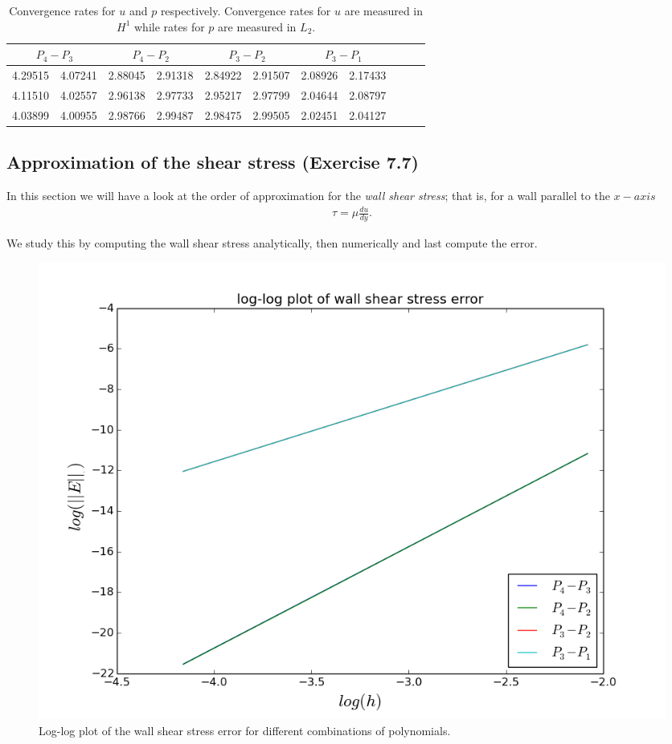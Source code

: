 \documentclass[11pt,a4paper,english]{article}
\numberwithin{equation}{section}
\begin{document}
\begin{table}[H]
\centering
\caption{Convergence rates for $u$ and $p$ respectively. Convergence rates for $u$ are measured in $H^1$ while rates for $p$ are measured in $L_2$.}
\vspace{3mm}
\begin{tabular}{|l|l|l|l|l|l|l|l|l|l|l|}
\hline
 \multicolumn{2}{|c|}{ $P_4-P_3$} &  \multicolumn{2}{|c|}{ $P_4-P_2$} &  \multicolumn{2}{|c|}{ $P_3-P_2$} &  \multicolumn{2}{|c|}{ $P_3-P_1$} \\
\hline
4.29515 & 4.07241 & 2.88045 & 2.91318 & 2.84922 & 2.91507 & 2.08926 & 2.17433 \\
\hline
4.11510 & 4.02557 & 2.96138 & 2.97733 & 2.95217 & 2.97799 & 2.04644 & 2.08797 \\
\hline
4.03899 & 4.00955 & 2.98766 & 2.99487 & 2.98475 & 2.99505 & 2.02451 & 2.04127 \\
\hline
\end{tabular}
\end{table}


\newpage 

\subsection{Approximation of the shear stress (Exercise 7.7)}

In this section we will have a look at the order of approximation for the \emph{wall shear stress}; that is, for a wall parallel to the $x-axis$ 
\begin{align*}
\tau = \mu \frac{du}{dy}.
\end{align*}

We study this by computing the wall shear stress analytically, then numerically and last compute the error. 

\begin{figure}[h!] 
\begin{center}
  \includegraphics[scale=0.3]{shearstress_error.png}
  \end{center}
  \caption{Log-log plot of the wall shear stress error for different combinations of polynomials.}
   \label{fig:shearstress}
\end{figure}
\end{document}
